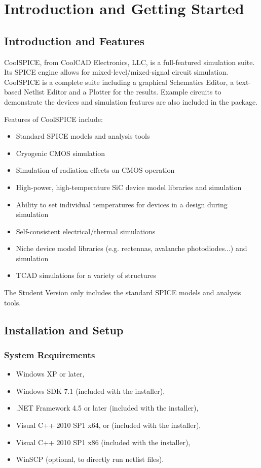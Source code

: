 \chapter{Introduction and Getting Started}

\section{Introduction and Features}

CoolSPICE, from CoolCAD Electronics, LLC, is a full-featured simulation suite.  Its SPICE engine allows for mixed-level/mixed-signal circuit simulation. CoolSPICE is a complete suite including a graphical Schematics Editor, a text-based Netlist Editor and a Plotter for the results. Example circuits to demonstrate the devices and simulation features are also included in the package.

Features of CoolSPICE include:

\begin{itemize} 
	\item Standard SPICE models and analysis tools
	\item Cryogenic CMOS simulation
	\item Simulation of radiation effects on CMOS operation
	\item High-power, high-temperature SiC device model libraries and simulation 
	\item Ability to set individual temperatures for devices in a design during simulation
	\item Self-consistent electrical/thermal simulations
	\item Niche device model libraries (e.g. rectennas, avalanche photodiodes...) and simulation	
	\item TCAD simulations for a variety of structures
\end{itemize}

The Student Version only includes the standard SPICE models and analysis tools.


\section{Installation and Setup}


\subsection{System Requirements}


\begin{itemize}
\item Windows XP or later,
\item Windows SDK 7.1 (included with the installer),
\item .NET Framework 4.5 or later (included with the installer),
\item Visual C++ 2010 SP1 x64, or (included with the installer),
\item Visual C++ 2010 SP1 x86 (included with the installer),
\item WinSCP (optional, to directly run netlist files).
\end{itemize}

